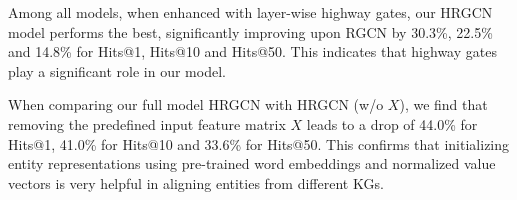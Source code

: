 	Among all models, when enhanced with layer-wise highway gates, our HRGCN model performs the best, significantly improving upon RGCN by 30.3\%, 22.5\% and 14.8\% for Hits@1, Hits@10 and Hits@50. This indicates that highway gates play a significant role in our model.
	
	When comparing our full model HRGCN with HRGCN (w/o $X$), we find that removing the predefined input feature matrix $X$ leads to a drop of 44.0\% for Hits@1, 41.0\% for Hits@10 and 33.6\% for Hits@50. This confirms that initializing entity representations using pre-trained word embeddings and normalized value vectors is very helpful in aligning entities from different KGs.
	
	
	
	
